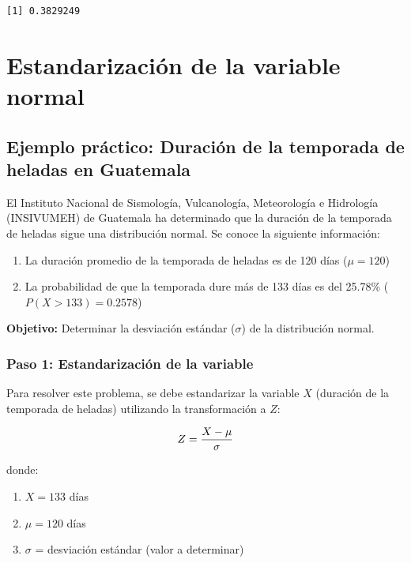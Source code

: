 \documentclass[
  spanish,
  letterpaper,
]{book}
\begin{document}
\begin{verbatim}
[1] 0.3829249
\end{verbatim}

\section{Estandarización de la variable
normal}\label{estandarizaciuxf3n-de-la-variable-normal}

\subsection{Ejemplo práctico: Duración de la temporada de heladas en
Guatemala}\label{ejemplo-pruxe1ctico-duraciuxf3n-de-la-temporada-de-heladas-en-guatemala}

El Instituto Nacional de Sismología, Vulcanología, Meteorología e
Hidrología (INSIVUMEH) de Guatemala ha determinado que la duración de la
temporada de heladas sigue una distribución normal. Se conoce la
siguiente información:

\begin{enumerate}
\def\labelenumi{\arabic{enumi}.}
\item
  La duración promedio de la temporada de heladas es de 120 días
  (\(\mu = 120\))
\item
  La probabilidad de que la temporada dure más de 133 días es del
  25.78\% (\(P(X > 133) = 0.2578\))
\end{enumerate}

\textbf{Objetivo:} Determinar la desviación estándar (\(\sigma\)) de la
distribución normal.

\subsubsection{Paso 1: Estandarización de la
variable}\label{paso-1-estandarizaciuxf3n-de-la-variable}

Para resolver este problema, se debe estandarizar la variable \(X\)
(duración de la temporada de heladas) utilizando la transformación a
\(Z\):

\[\huge Z = \frac{X - \mu}{\sigma} \]

donde:

\begin{enumerate}
\def\labelenumi{\arabic{enumi}.}
\item
  \(X = 133\) días
\item
  \(\mu = 120\) días
\item
  \(\sigma\) = desviación estándar (valor a determinar)
\end{enumerate}
\end{document}
